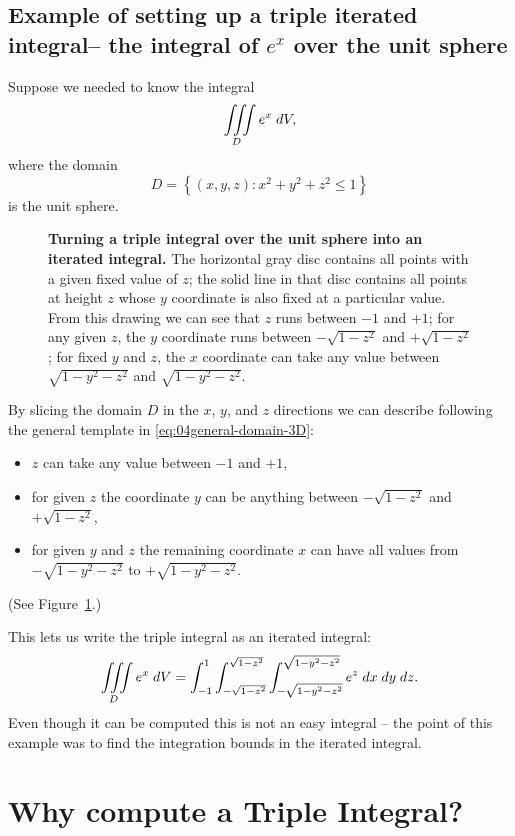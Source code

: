 \subsection{Example of setting up a triple iterated integral-- the integral of $e^x$ over the unit sphere}  
Suppose we needed to know the integral
\[
\iiint\limits_D e^x \; dV,
\]
where the domain
\[
D = \left\{ (x,y,z) : x^2+y^2+z^2 \le 1 \right\}
\]
is the unit sphere.
\begin{figure}[t]
  
  \caption{\textbf{Turning a triple integral over the unit sphere into
  an iterated integral. } The horizontal gray disc contains all points
  with a given fixed value of $z$; the solid line in that disc
  contains all points at height $z$ whose $y$ coordinate is also fixed
  at a particular value.  From this drawing we can see that $z$ runs
  between $-1$ and $+1$; for any given $z$, the $y$ coordinate runs
  between $-\sqrt{1-z^2}$ and $+\sqrt{1-z^2}$; for fixed $y$ and $z$,
  the $x$ coordinate can take any value between $\sqrt{1-y^2-z^2}$ and
  $\sqrt{1-y^2-z^2}$.}
  \label{fig:04integral-over-sphere}
\end{figure}
By slicing the domain $D$ in the $x$, $y$, and $z$ directions we can describe following the general template in \eqref{eq:04general-domain-3D}:
\begin{itemize}

\item $z$ can take any value between $-1$ and $+1$, 

\item for given $z$ the coordinate $y$ can be anything between $-\sqrt{1-z^2}$ and $+\sqrt{1-z^2}$, 

\item for given $y$ and $z$ the remaining coordinate $x$ can have all values
from $-\sqrt{1-y^2-z^2}$ to $+\sqrt{1 - y^2 - z^2}$.

\end{itemize}
(See Figure~\ref{fig:04integral-over-sphere}.)

This lets us write the triple integral as an iterated integral:
\[
\iiint\limits_D e^x \; dV
=
\int_{-1}^1 \int_{-\sqrt{1-z^2}}^{\sqrt{1-z^2}}
\int_{-\sqrt{1-y^2-z^2}}^{\sqrt{1-y^2-z^2}}
e^z \; dx\; dy\; dz.
\]
Even though it can be computed this is not an easy integral -- the point of
this example was to find the integration bounds in the iterated
integral.

\section{Why compute a Triple Integral?}  

